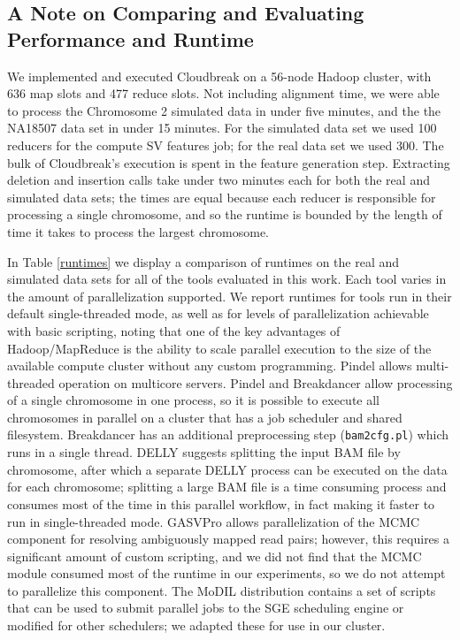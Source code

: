 \subsection{A Note on Comparing and Evaluating Performance and Runtime}

We implemented and executed Cloudbreak on a 56-node Hadoop cluster, with 636 map slots and 477 reduce slots. Not including alignment time, we were able to process the Chromosome 2 simulated data in under five minutes, and the the NA18507 data set in under 15 minutes. For the simulated data set we used 100 reducers for the compute SV features job; for the real data set we used 300. The bulk of Cloudbreak's execution is spent in the feature generation step. Extracting deletion and insertion calls take under two minutes each for both the real and simulated data sets; the times are equal because each reducer is responsible for processing a single chromosome, and so the runtime is bounded by the length of time it takes to process the largest chromosome. 

In Table \ref{runtimes} we display a comparison of runtimes on the real and simulated data sets for all of the tools evaluated in this work. Each tool varies in the amount of parallelization supported. We report runtimes for tools run in their default single-threaded mode, as well as for levels of parallelization achievable with basic scripting, noting that one of the key advantages of Hadoop/MapReduce is the ability to scale parallel execution to the size of the available compute cluster without any custom programming. Pindel allows multi-threaded operation on multicore servers. Pindel and Breakdancer allow processing of a single chromosome in one process, so it is possible to execute all chromosomes in parallel on a cluster that has a job scheduler and shared filesystem. Breakdancer has an additional preprocessing step (\texttt{bam2cfg.pl}) which runs in a single thread. DELLY suggests splitting the input BAM file by chromosome, after which a separate DELLY process can be executed on the data for each chromosome; splitting a large BAM file is a time consuming process and consumes most of the time in this parallel workflow, in fact making it faster to run in single-threaded mode. GASVPro allows parallelization of the MCMC component for resolving ambiguously mapped read pairs; however, this requires a significant amount of custom scripting, and we did not find that the MCMC module consumed most of the runtime in our experiments, so we do not attempt to parallelize this component. The MoDIL distribution contains a set of scripts that can be used to submit parallel jobs to the SGE scheduling engine or modified for other schedulers; we adapted these for use in our cluster.


